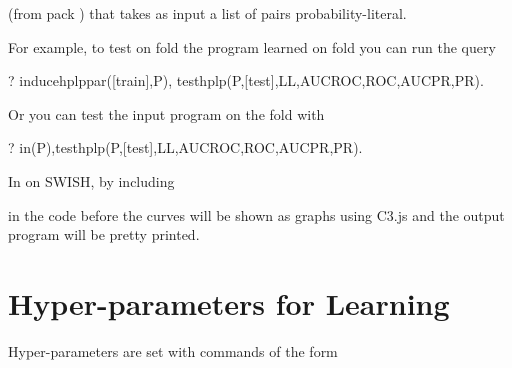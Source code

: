 \documentclass[letterpaper,10pt,english]{sphinxmanual}
\begin{document}
(from pack ) that takes as input a list  of pairs probability-literal.

For example, to test on fold  the program learned on fold  you can run the query

%
\begin{sphinxVerbatim}[commandchars=\\\{\}]
?\PYGZhy{} induce\PYGZus{}hplp\PYGZus{}par([train],P),
test\PYGZus{}hplp(P,[test],LL,AUCROC,ROC,AUCPR,PR).
\end{sphinxVerbatim}

Or you can test the input program on the fold  with

%
\begin{sphinxVerbatim}[commandchars=\\\{\}]
?\PYGZhy{} in(P),test\PYGZus{}hplp(P,[test],LL,AUCROC,ROC,AUCPR,PR).
\end{sphinxVerbatim}

In  on SWISH, by including

%
\begin{sphinxVerbatim}[commandchars=\\\{\}]
 
 
\end{sphinxVerbatim}

in the code before  the curves will be shown as graphs using C3.js and the output program will be pretty printed.


\section{Hyper-parameters for Learning}
\label{\detokenize{index:hyper-parameters-for-learning}}
Hyper-parameters are set with commands of the form

%
\begin{sphinxVerbatim}[commandchars=\\\{\}]
 
\end{sphinxVerbatim}
\end{document}

